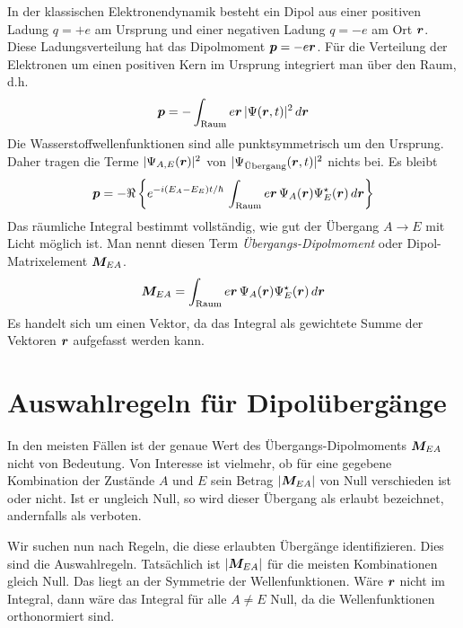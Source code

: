 In der klassischen Elektronendynamik besteht ein Dipol aus einer positiven Ladung $q=+e$ am Ursprung und einer negativen Ladung $q=-e$ am Ort $\boldsymbol{r}$. Diese Ladungsverteilung hat das Dipolmoment $\boldsymbol{p} = -e \boldsymbol{r}$. Für die Verteilung der Elektronen um einen positiven Kern im Ursprung integriert man über den Raum, d.h. 
\begin{equation}
    \boldsymbol{p} = - \int_\text{Raum} e\boldsymbol{r} \,  | \Psi(\boldsymbol{r}, t) |^2 \, d \boldsymbol{r} 
\end{equation}
Die Wasserstoffwellenfunktionen sind alle punktsymmetrisch um den Ursprung. Daher tragen die Terme $ | \Psi_{A,E}(\boldsymbol{r})|^2$ von $| \Psi_\text{Übergang}(\boldsymbol{r},t)|^2$ nichts bei. Es bleibt 
\begin{equation}
    \boldsymbol{p} =  - \Re \left \{ e^{-i (E_A - E_E) t / \hbar}  \, \int_\text{Raum} e\boldsymbol{r} \,  \Psi_A(\boldsymbol{r})\Psi_E^\star(\boldsymbol{r})  \, d \boldsymbol{r} \right \}
\end{equation}
Das räumliche Integral bestimmt vollständig, wie gut der Übergang $A \rightarrow E$ mit Licht möglich ist. Man nennt diesen Term \emph{Übergangs-Dipolmoment} oder Dipol-Matrixelement $\boldsymbol{M}_{EA}$.
\begin{equation}
    \boldsymbol{M}_{EA} = \int_\text{Raum} e\boldsymbol{r} \,  \Psi_A(\boldsymbol{r})\Psi_E^\star(\boldsymbol{r})  \, d \boldsymbol{r} 
    \label{eq:7_Matrix_element}
\end{equation}
Es handelt sich um einen Vektor, da das Integral als gewichtete Summe der Vektoren $\boldsymbol{r}$ aufgefasst werden kann.


\section{Auswahlregeln für Dipolübergänge}

In den meisten Fällen ist der genaue Wert des Übergangs-Dipolmoments $\boldsymbol{M}_{EA}$ nicht von Bedeutung. Von Interesse ist vielmehr, ob 
für eine gegebene Kombination der Zustände $A$ und $E$ sein Betrag $|\boldsymbol{M}_{EA}|$ von Null verschieden ist oder nicht. Ist er ungleich Null, so wird dieser Übergang als erlaubt bezeichnet, andernfalls als verboten. 

Wir suchen nun nach Regeln, die diese erlaubten Übergänge identifizieren. Dies sind die Auswahlregeln. Tatsächlich ist $|\boldsymbol{M}_{EA}|$ für die meisten Kombinationen gleich Null. Das liegt an der Symmetrie der Wellenfunktionen. Wäre $\boldsymbol{r}$ nicht im Integral, dann wäre das Integral für alle $A \neq E$ Null, da die Wellenfunktionen orthonormiert sind.

